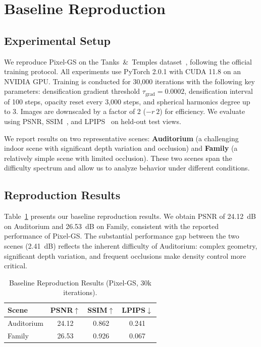 \documentclass[conference]{IEEEtran}
\begin{document}
\section{Baseline Reproduction}
\label{sec:baseline}

\subsection{Experimental Setup}

We reproduce Pixel-GS on the Tanks~\&~Temples dataset~\cite{knapitsch2017tanks}, following the official training protocol. All experiments use PyTorch 2.0.1 with CUDA 11.8 on an NVIDIA GPU. Training is conducted for 30,000 iterations with the following key parameters: densification gradient threshold $\tau_\text{grad} = 0.0002$, densification interval of 100 steps, opacity reset every 3,000 steps, and spherical harmonics degree up to 3. Images are downscaled by a factor of 2 ($-r\ 2$) for efficiency. We evaluate using PSNR, SSIM~\cite{wang2004image}, and LPIPS~\cite{zhang2018unreasonable} on held-out test views.

We report results on two representative scenes: \textbf{Auditorium} (a challenging indoor scene with significant depth variation and occlusion) and \textbf{Family} (a relatively simple scene with limited occlusion). These two scenes span the difficulty spectrum and allow us to analyze behavior under different conditions.

\subsection{Reproduction Results}

Table~\ref{tab:baseline} presents our baseline reproduction results. We obtain PSNR of 24.12~dB on Auditorium and 26.53~dB on Family, consistent with the reported performance of Pixel-GS. The substantial performance gap between the two scenes (2.41~dB) reflects the inherent difficulty of Auditorium: complex geometry, significant depth variation, and frequent occlusions make density control more critical.

\begin{table}[t]
\centering
\caption{Baseline Reproduction Results (Pixel-GS, 30k iterations).}
\label{tab:baseline}
\begin{tabular}{lccc}
\toprule
Scene & PSNR$\uparrow$ & SSIM$\uparrow$ & LPIPS$\downarrow$ \\
\midrule
Auditorium & 24.12 & 0.862 & 0.241 \\
Family & 26.53 & 0.926 & 0.067 \\
\bottomrule
\end{tabular}
\end{table}
\end{document}
